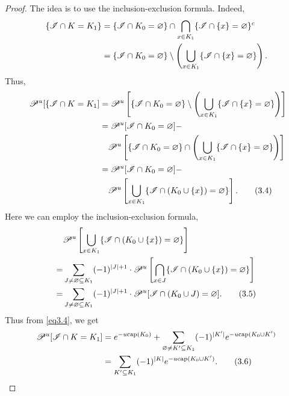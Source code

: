 \documentclass[
11pt, %
a4paper, %
oneside, %
headinclude,footinclude, %
BCOR5mm, %
]{scrartcl}
\begin{document}
\begin{proof}
    The idea is to use the inclusion-exclusion formula. Indeed,
    \begin{align}
        \{\mathscr{I} \cap K=K_1\}&=\{ \mathscr{I} \cap K_0 = \varnothing \} \cap \bigcap_{x \in K_1}\{ \mathscr{I} \cap \{x \} = \varnothing \}^c \notag \\
        &=\{ \mathscr{I} \cap K_0= \varnothing\}\setminus\left(\bigcup_{x \in K_1}\{ \mathscr{I} \cap \{x\} = \varnothing\}\right). \notag
    \end{align}
    Thus,
    \begin{align}\
        \label{eq3.4}
        \mathscr{P}^u[\{\mathscr{I} \cap K=K_1]&=\mathscr{P}^u\left[\{ \mathscr{I} \cap K_0= \varnothing\}\setminus\left(\bigcup_{x \in K_1}\{ \mathscr{I} \cap \{x\} = \varnothing\}\right)\right] \notag \\
        &=\mathscr{P}^u[\mathscr{I} \cap K_0= \varnothing] - \notag \\ & \quad \mathscr{P}^u \left[ \{ \mathscr{I} \cap K_0= \varnothing\} \cap \left(\bigcup_{x \in K_1}\{ \mathscr{I} \cap \{x\} = \varnothing\}\right) \right] \notag \\
        &=\mathscr{P}^u[\mathscr{I} \cap K_0= \varnothing] - \notag \\ & \quad \mathscr{P}^u \left[ \bigcup_{x \in K_1}\{ \mathscr{I} \cap (K_0 \cup \{x\}) = \varnothing \} \right]. \tag{3.4} 
    \end{align}
    Here we can employ the inclusion-exclusion formula,
    \begin{align}
        \label{eq3.5}
        &\mathscr{P}^u \left[ \bigcup_{x \in K_1}\{ \mathscr{I} \cap (K_0 \cup \{x\}) = \varnothing \} \right] \notag \\
        =&\sum_{J \neq \varnothing \subseteq K_1}(-1)^{\mid J \mid + 1} \cdot \mathscr{P}^u \left[ \bigcap_{x \in J}\{ \mathscr{I} \cap (K_0 \cup \{x\}) = \varnothing \} \right] \notag \\
        =&\sum_{J \neq \varnothing \subseteq K_1}(-1)^{\mid J \mid + 1} \cdot \mathscr{P}^u[\mathscr{I} \cap (K_0 \cup J) = \varnothing]. \tag{3.5}
    \end{align}
    Thus from \eqref{eq3.4}, we get
    \begin{align}
        \label{eq3.6}
        \mathscr{P}^u[\mathscr{I} \cap K=K_1]&=e^{-u \text{cap}(K_0)} + \sum_{\varnothing \neq K' \subseteq K_1} (-1)^{\mid K' \mid}e^{-u \text{cap}(K_0 \cup K')} \notag \\
        &=\sum_{K' \subseteq K_1}(-1)^{\mid K \mid}e^{-u \text{cap}(K_0 \cup K')}. \tag{3.6}
    \end{align}   
\end{proof}
\end{document}
